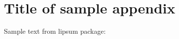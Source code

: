 \documentclass[bookType,partialBuild]{../../ThesisClass/ThesisClass}
\begin{document}
\fi
\ifdefined \bookType
	\cleardoublepage
\fi



\chapter[Short Title of Sample Appendix]{Title of sample appendix}


Sample text from lipsum package: \lipsum[21-32]


\ifdefined \partialBuild
	
	
\end{document}
